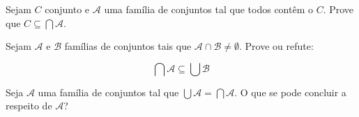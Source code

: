 \begin{exercise}
Sejam $C$ conjunto e $\mathscr A$ uma família de conjuntos tal que todos contêm o $C$. Prove que $C \subseteq \bigcap \mathscr A$. 
\end{exercise}

\begin{exercise}
Sejam $\mathscr A$ e $\mathscr B$ famílias de conjuntos tais que $\mathscr A \cap \mathscr B \ne \emptyset$. Prove ou refute:

\begin{equation}
\bigcap \mathscr A \subseteq \bigcup \mathscr B
\end{equation}
\end{exercise}

\begin{exercise}
Seja $\mathscr A$ uma família de conjuntos tal que $\bigcup \mathscr A = \bigcap \mathscr A$. O que se pode concluir a respeito de $\mathscr A$?
\end{exercise}
